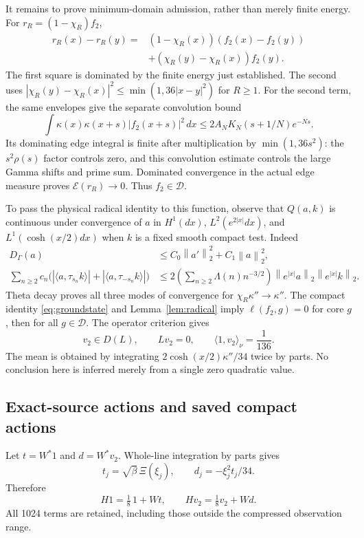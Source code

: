 \documentclass[11pt,a4paper]{article}
\numberwithin{equation}{section}
\theoremstyle{definition}\newtheorem{definition}[theorem]{Definition}
\theoremstyle{remark}\newtheorem{remark}[theorem]{Remark}
\newcommand{\DD}{\mathcal D}
\newcommand{\EE}{\mathcal E}
\newcommand{\ip}[2]{\langle #1,#2\rangle}
\newcommand{\norm}[1]{\left\|#1\right\|}
\begin{document}
It remains to prove minimum-domain admission, rather than merely finite energy. For $r_R=(1-\chi_R)f_2$,
\begin{align}
 r_R(x)-r_R(y)={}&(1-\chi_R(x))(f_2(x)-f_2(y))\nonumber\\
 &+(\chi_R(y)-\chi_R(x))f_2(y).
\end{align}
The first square is dominated by the finite energy just established. The second uses
$|\chi_R(y)-\chi_R(x)|^2\le\min(1,36|x-y|^2)$ for $R\ge1$.
For the second term, the same envelopes give the separate convolution bound
\[
 \int\kappa(x)\kappa(x+s)|f_2(x+s)|^2\,dx
 \le2A_NK_N(s+1/N)e^{-Ns}.
\]
Its dominating edge integral is finite after multiplication by $\min(1,36s^2)$: the $s^2\rho(s)$ factor controls zero, and this convolution estimate controls the large Gamma shifts and prime sum. Dominated convergence in the actual edge measure proves $\EE(r_R)\to0$. Thus $f_2\in\DD$.

To pass the physical radical identity to this function, observe that $Q(a,k)$ is continuous under convergence of $a$ in $H^1(dx)$, $L^2(e^{2|x|}dx)$, and $L^1(\cosh(x/2)dx)$ when $k$ is a fixed smooth compact test. Indeed
\begin{align}
 D_\Gamma(a)&\le C_0\norm{a'}_2^2+C_1\norm a_2^2,\\
 \sum_{n\ge2}c_n\bigl(|\ip a{\tau_{s_n}k}|+|\ip a{\tau_{-s_n}k}|\bigr)
 &\le2\left(\sum_{n\ge2}\Lambda(n)n^{-3/2}\right)
 \norm{e^{|x|}a}_2\norm{e^{|x|}k}_2.
\end{align}
Theta decay proves all three modes of convergence for $\chi_R\kappa''\to\kappa''$. The compact identity \eqref{eq:groundstate} and Lemma~\ref{lem:radical} imply $\ell(f_2,g)=0$ for core $g$, then for all $g\in\DD$. The operator criterion gives
\begin{equation}\label{eq:sourcezero}
 v_2\in D(L),\qquad Lv_2=0,
 \qquad \ip1{v_2}_\nu=\frac1{136}.
\end{equation}
The mean is obtained by integrating $2\cosh(x/2)\kappa''/34$ twice by parts. No conclusion here is inferred merely from a single zero quadratic value.

\subsection{Exact-source actions and saved compact actions}
Let $t=W^*1$ and $d=W^*v_2$. Whole-line integration by parts gives
\begin{equation}\label{eq:td}
 t_j=\sqrt\beta\,\Xi(\xi_j),\qquad d_j=-\xi_j^2t_j/34.
\end{equation}
Therefore
\begin{equation}\label{eq:exactactions}
 H1=\tfrac18\,1+Wt,\qquad Hv_2=\tfrac18v_2+Wd.
\end{equation}
All 1024 terms are retained, including those outside the compressed observation range.
\end{document}
